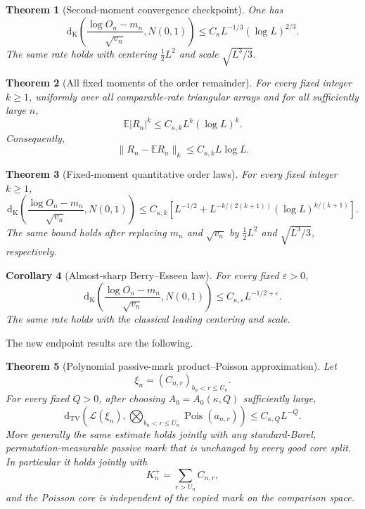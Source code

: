 \documentclass[11pt]{article}
\newtheorem{theorem}{Theorem}[section]
\newtheorem{corollary}[theorem]{Corollary}
\theoremstyle{remark}
\newcommand{\Ee}{\mathbb E}
\newcommand{\Pois}{\operatorname{Pois}}
\newcommand{\Kol}{\mathrm d_{\mathrm K}}
\newcommand{\TV}{\mathrm d_{\mathrm{TV}}}
\newcommand{\cL}{\mathcal L}
\begin{document}
\begin{theorem}[Second-moment convergence checkpoint]
\label{thm:order-second-checkpoint}
One has
\[
 \Kol\!\left(
 \frac{\log O_n-m_n}{\sqrt{v_n}},N(0,1)\right)
 \le C_\kappa L^{-1/3}(\log L)^{2/3}.
\]
The same rate holds with centering $\frac12L^2$ and scale
$\sqrt{L^3/3}$.
\end{theorem}

\begin{theorem}[All fixed moments of the order remainder]
\label{thm:R-all-moments}
For every fixed integer $k\ge1$, uniformly over all comparable-rate
triangular arrays and for all sufficiently large $n$,
\[
 \Ee|R_n|^k\le C_{\kappa,k}L^k(\log L)^k.
\]
Consequently,
\[
 \|R_n-\Ee R_n\|_k\le C_{\kappa,k}L\log L.
\]
\end{theorem}

\begin{theorem}[Fixed-moment quantitative order laws]
\label{thm:order-fixed-moments}
For every fixed integer $k\ge1$,
\[
 \Kol\!\left(
 \frac{\log O_n-m_n}{\sqrt{v_n}},N(0,1)\right)
 \le C_{\kappa,k}\left[
 L^{-1/2}+L^{-k/(2(k+1))}(\log L)^{k/(k+1)}
 \right].
\]
The same bound holds after replacing $m_n$ and $\sqrt{v_n}$ by
$\frac12L^2$ and $\sqrt{L^3/3}$, respectively.
\end{theorem}

\begin{corollary}[Almost-sharp Berry--Esseen law]
\label{cor:order-almost-sharp}
For every fixed $\varepsilon>0$,
\[
 \Kol\!\left(
 \frac{\log O_n-m_n}{\sqrt{v_n}},N(0,1)\right)
 \le C_{\kappa,\varepsilon}L^{-1/2+\varepsilon}.
\]
The same rate holds with the classical leading centering and scale.
\end{corollary}

The new endpoint results are the following.

\begin{theorem}[Polynomial passive-mark product--Poisson approximation]
\label{thm:poly-pp}
Let
\[
 \xi_n=(C_{n,r})_{b_n<r\le U_n}.
\]
For every fixed $Q>0$, after choosing $A_0=A_0(\kappa,Q)$ sufficiently
large,
\[
 \TV\!\left(
 \cL(\xi_n),
 \bigotimes_{b_n<r\le U_n}\Pois(a_{n,r})
 \right)
 \le C_{\kappa,Q}L^{-Q}.
\]
More generally the same estimate holds jointly with any standard-Borel,
permutation-measurable passive mark that is unchanged by every good core
split.  In particular it holds jointly with
\[
 K_n^+=\sum_{r>U_n}C_{n,r},
\]
and the Poisson core is independent of the copied mark on the comparison
space.
\end{theorem}
\end{document}
